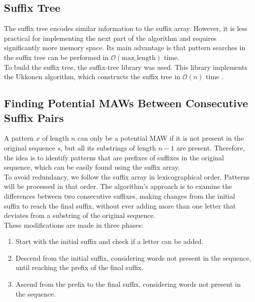 \documentclass[conference]{IEEEtran}
\begin{document}
\subsection{Suffix Tree}
The suffix tree encodes similar information to the suffix array. However, it is less practical for implementing the next part of the algorithm and requires significantly more memory space. Its main advantage is that pattern searches in the suffix tree can be performed in $\mathcal O(\text{max\_length})$ time.\\
To build the suffix tree, the suffix-tree library \cite{b5} was used. This library implements the Ukkonen algorithm, which constructs the suffix tree in $\mathcal O(n)$ time \cite{b6}.
\subsection{Finding Potential MAWs Between Consecutive Suffix Pairs}
A pattern $x$ of length $n$ can only be a potential MAW if it is not present in the original sequence $s$, but all its substrings of length $n-1$ are present. Therefore, the idea is to identify patterns that are prefixes of suffixes in the original sequence, which can be easily found using the suffix array.\\
To avoid redundancy, we follow the suffix array in lexicographical order. Patterns will be processed in that order. The algorithm's approach is to examine the differences between two consecutive suffixes, making changes from the initial suffix to reach the final suffix, without ever adding more than one letter that deviates from a substring of the original sequence.\\
These modifications are made in three phases:
\begin{enumerate}
\item Start with the initial suffix and check if a letter can be added.
\item Descend from the initial suffix, considering words not present in the sequence, until reaching the prefix of the final suffix.
\item Ascend from the prefix to the final suffix, considering words not present in the sequence.
\end{enumerate}
\end{document}
